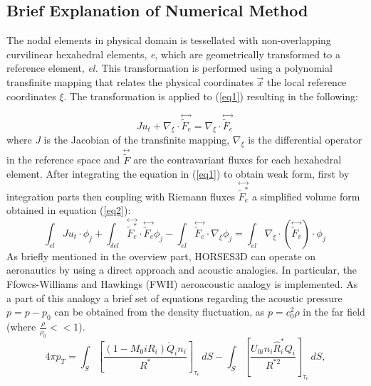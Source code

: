 \documentclass{article}
\begin{document}
		\subsection{Brief Explanation of Numerical Method}	
		The nodal elements in physical domain is tessellated with non-overlapping curvilinear hexahedral elements, \textit{e}, which are geometrically transformed to a reference element, \textit{el.} This transformation is performed using a polynomial transfinite mapping that relates the physical coordinates $\overset{\rightarrow}{x}$ the local reference coordinates $\xi$. The transformation is applied to (\ref{eq1}) resulting in the following:
		
			\begin{equation}
				\label{eq1}
				Ju_{t} + \nabla_{\xi}  \cdot \overset{\leftrightarrow}{\tilde{F}_e} = \nabla_{\xi} \cdot \overset{\leftrightarrow}{\tilde{F}_e} \
			\end{equation}
			where \textit{J} is the Jacobian of the transfinite mapping, $\nabla_{\xi}$ is the differential operator in the reference space and $\overset{\leftrightarrow}{\tilde{F}}$ are the contravariant fluxes for each hexahedral element.	
			After integrating the equation in (\ref{eq1}) to obtain weak form, first by integration parts then coupling with Riemann fluxes $\overset{\leftrightarrow}{\tilde{F}^{*}_{e}}$ a simplified volume form obtained in equation (\ref{eq2}):
		\begin{equation}
			\label{eq2}
			\int_\textit{el} Ju_{t} \cdot \phi_{j} + \int_{\delta\textit{el}} \overset{\leftrightarrow}{\tilde{F}^{*}_{e}}\cdot \overset{\leftrightarrow}{\tilde{F}_e}\phi_{j} - \int_\textit{el} \overset{\leftrightarrow}{\tilde{F}_e} \cdot \nabla_{\xi}\phi_{j} = \int_\textit{el} \nabla_{\xi} \cdot  (\overset{\leftrightarrow}{\tilde{F}_v}) \cdot \phi_{j}  \
		\end{equation}
		As briefly mentioned in the overview part, HORSES3D can operate on aeronautics by using a direct approach and acoustic analogies. In particular, the Ffowcs-Williams and Hawkings (FWH) aeroacoustic analogy is implemented. As a part of this analogy a brief set of equations regarding the acoustic pressure $p=p-p_{0}$ can be obtained from the density fluctuation, as $p=c^{2}_{0}\rho$ in the far field (where $\frac{\rho}{\rho_{0}}<<1$).
		\begin{equation}
  \label{eq3}
			4\pi p_T = \int_S \left[\frac{(1 - M_0 iR_i) \dot{Q}_{i} n_i}{R^*}\right]_{\tau_{e}}\, dS - \int_S \left[ \frac{U_{0i}n_i\hat{R}^*_i Q_{i}}{R^{*2}} \right ]_{\tau_{e}} \, dS,
		\end{equation}
\end{document}
